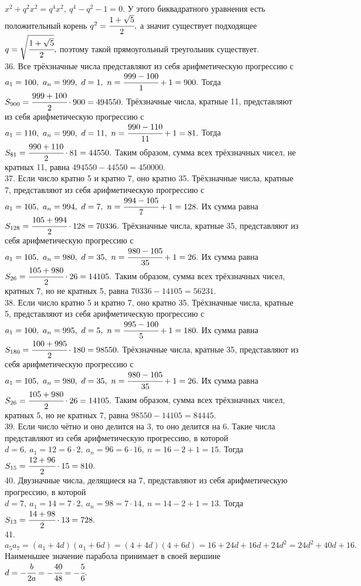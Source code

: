 $x^2+q^2x^2=q^4x^2,\ q^4-q^2-1=0.$ У этого биквадратного уравнения есть положительный корень $q^2=\cfrac{1+\sqrt{5}}{2},$ а значит существует подходящее $q=\sqrt{\cfrac{1+\sqrt{5}}{2}},$ поэтому такой прямоугольный треугольник существует.\\
36. Все трёхзначные числа представляют из себя арифметическую прогрессию с $a_1=100,\ a_n=999,\ d=1,\ n=\cfrac{999-100}{1}+1=900.$ Тогда $S_{900}=\cfrac{999+100}{2}\cdot900=494550.$ Трёхзначные числа, кратные 11, представляют из себя арифметическую прогрессию с $a_1=110,\ a_n=990,\ d=11,\ n=\cfrac{990-110}{11}+1=81.$ Тогда $S_{81}=\cfrac{990+110}{2}\cdot81=44550.$ Таким образом, сумма всех трёхзначных чисел, не кратных 11, равна $494550-44550=450000.$\\
37. Если число кратно 5 и кратно 7, оно кратно 35. Трёхзначные числа, кратные 7, представляют из себя арифметическую прогрессию с $a_1=105,\ a_n=994,\ d=7,\ n=\cfrac{994-105}{7}+1=128.$ Их сумма равна $S_{128}=\cfrac{105+994}{2}\cdot128=70336.$ Трёхзначные числа, кратные 35, представляют из себя арифметическую прогрессию с $a_1=105,\ a_n=980,\ d=35,\ n=\cfrac{980-105}{35}+1=26.$ Их сумма равна $S_{26}=\cfrac{105+980}{2}\cdot26=14105.$ Таким образом, сумма всех трёхзначных чисел, кратных 7, но не кратных 5, равна $70336-14105=56231.$\\
38. Если число кратно 5 и кратно 7, оно кратно 35. Трёхзначные числа, кратные 5, представляют из себя арифметическую прогрессию с $a_1=100,\ a_n=995,\ d=5,\ n=\cfrac{995-100}{5}+1=180.$ Их сумма равна $S_{180}=\cfrac{100+995}{2}\cdot180=98550.$ Трёхзначные числа, кратные 35, представляют из себя арифметическую прогрессию с $a_1=105,\ a_n=980,\ d=35,\ n=\cfrac{980-105}{35}+1=26.$ Их сумма равна $S_{26}=\cfrac{105+980}{2}\cdot26=14105.$ Таким образом, сумма всех трёхзначных чисел, кратных 5, но не кратных 7, равна $98550-14105=84445.$\\
39. Если число чётно и оно делится на 3, то оно делится на 6. Такие числа представляют из себя арифметическую прогрессию, в которой $d=6,\ a_1=12=6\cdot2,\ a_n=96=6\cdot16,\ n=16-2+1=15.$ Тогда $S_{15}=\cfrac{12+96}{2}\cdot15=810.$\\
40. Двузначные числа, делящиеся на 7, представляют из себя арифметическую прогрессию, в которой $d=7,\ a_1=14=7\cdot2,\ a_n=98=7\cdot14,\ n=14-2+1=13.$ Тогда
$S_{13}=\cfrac{14+98}{2}\cdot13=728.$\\
41. $a_5a_7=(a_1+4d)(a_1+6d)=(4+4d)(4+6d)=16+24d+16d+24d^2=24d^2+40d+16.$ Наименьшее значение парабола принимает в своей вершине $d=-\cfrac{b}{2a}=-\cfrac{40}{48}=-\cfrac{5}{6}.$\\
